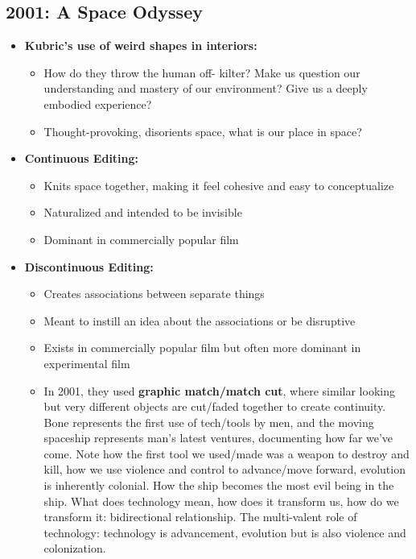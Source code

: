 \documentclass[11pt,fleqn]{book}
\begin{document}
\subsection{2001: A Space Odyssey}
\begin{itemize}
    \item \textbf{Kubric's use of weird shapes in interiors:}
    \begin{itemize}
        \item How do they throw the human off-
kilter? Make us question our
understanding and mastery of our
environment? Give us a deeply
embodied experience?
        \item Thought-provoking, disorients space, what is our place in space?
    \end{itemize}
    \item \textbf{Continuous Editing:}
    \begin{itemize}
        \item Knits space together, making it feel cohesive and easy to conceptualize
        \item Naturalized and intended to be invisible
        \item Dominant in commercially popular film
    \end{itemize}
    \item \textbf{Discontinuous Editing:}
    \begin{itemize}
        \item Creates associations between separate things
        \item Meant to instill an idea about the associations or be disruptive
        \item Exists in commercially popular film but often more dominant in experimental film
        \item In 2001, they used \textbf{graphic match/match cut}, where similar looking but very different objects are cut/faded together to create continuity. Bone represents the first use of tech/tools by men, and the moving spaceship represents man's latest ventures, documenting how far we've come. Note how the first tool we used/made was a weapon to destroy and kill, how we use violence and control to advance/move forward, evolution is inherently colonial. How the ship becomes the most evil being in the ship. What does technology mean, how does it transform us, how do we transform it: bidirectional relationship. The multi-valent role of technology: technology is advancement, evolution but is also violence and colonization. 
    \end{itemize}

\end{itemize}
\end{document}
